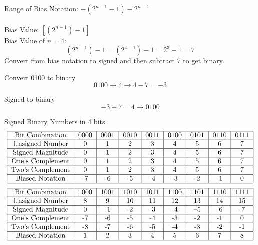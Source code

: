 \documentclass[12pt]{article}
\begin{document}
Range of Bias Notation: $-(2^{n - 1} - 1) - 2^{n - 1}$ \\~\\
Bias Value: $[(2^{n - 1}) - 1]$ \\
Bias Value of $n = 4$: $$(2^{n - 1}) - 1 = (2^{4 - 1}) - 1 = 2^3 - 1 = 7$$ 
Convert from bias notation to signed and then subtract 7 to get binary. 
\begin{example} Convert 0100 to binary 
$$ 0100 \to 4 \to 4 - 7 = -3 $$ \end{example}
\begin{example} Signed to binary
$$ -3 + 7 = 4 \to 0100 $$ \end{example}
Signed Binary Numbers in 4 bits 
$$ \begin{tabular}{|c|c|c|c|c|c|c|c|c|} \hline 
Bit Combination & 0000 & 0001 & 0010 & 0011 & 0100 & 0101 & 0110 & 0111 \\ \hline
Unsigned Number & 0 & 1 & 2 & 3 & 4 & 5 & 6 & 7 \\ \hline
Signed Magnitude & 0 & 1 & 2 & 3 & 4 & 5 & 6 & 7  \\ \hline
One's Complement & 0 & 1 & 2 & 3 & 4 & 5 & 6 & 7  \\ \hline
Two's Complement & 0 & 1 & 2 & 3 & 4 & 5 & 6 & 7 \\ \hline
Biased Notation & -7 & -6 & -5 & -4 & -3 & -2 & -1 & 0 \\ \hline \end{tabular} $$ 
$$ \begin{tabular}{|c|c|c|c|c|c|c|c|c|} \hline 
Bit Combination &1000 & 1001 & 1010 & 1011 & 1100 & 1101 & 1110 & 1111 \\ \hline
Unsigned Number & 8 & 9 & 10 & 11 & 12 & 13 & 14 & 15 \\ \hline
Signed Magnitude & 0 & -1 & -2 & -3 & -4 & --5 & -6 & -7  \\ \hline
One's Complement & -7 & -6 & -5 & -4 & -3 & -2 & -1 & 0 \\ \hline
Two's Complement & -8 & -7 & -6 & -5 & -4 & -3 & -2 & -1 \\ \hline
Biased Notation & 1 & 2 & 3 & 4 & 5 & 6 & 7 & 8 \\ \hline \end{tabular} $$ 
\end{document}
